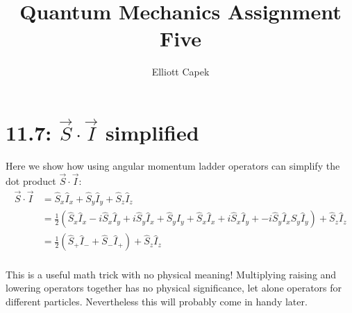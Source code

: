 \documentclass[10pt]{article} %
\title{Quantum Mechanics Assignment Five}
\author{Elliott Capek}
\begin{document}
\maketitle{}

\section{11.7: $\vec{S} \cdot \vec{I}$ simplified}

Here we show how using angular momentum ladder operators can simplify the dot product
$\vec{S} \cdot \vec{I}$:\\

\begin{align*}
  \vec{S} \cdot \vec{I} &= \hat{S}_x\hat{I}_x + \hat{S}_y\hat{I}_y + \hat{S}_z\hat{I}_z\\
  &= \frac{1}{2}\left(\hat{S}_x\hat{I}_x -i\hat{S}_x\hat{I}_y + i\hat{S}_y\hat{I}_x
  + \hat{S}_y\hat{I}_y + \hat{S}_x\hat{I}_x + i\hat{S}_x\hat{I}_y
  + -i\hat{S}_y\hat{I}_x\hat{S}_y\hat{I}_y\right)
  + \hat{S}_z\hat{I}_z\\
  &= \frac{1}{2}\left(\hat{S}_+\hat{I}_- + \hat{S}_-\hat{I}_+\right) + \hat{S}_z\hat{I}_z\\
\end{align*}

This is a useful math trick with no physical meaning! Multiplying raising and lowering operators
together has no physical significance, let alone operators for different particles. Nevertheless
this will probably come in handy later.\\
\end{document}
